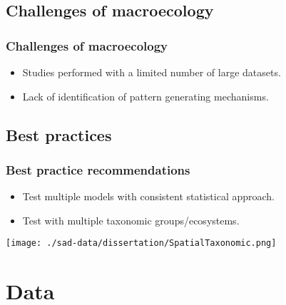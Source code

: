 \documentclass[14pt]{beamer}
\begin{document}
\subsection{Challenges of macroecology}
\begin{frame}[t]
\frametitle{Challenges of macroecology}
\begin{itemize}
\item Studies performed with a limited number of large datasets.
\item Lack of identification of pattern generating mechanisms.
\end{itemize}
\end{frame}



\subsection{Best practices}
\begin{frame}[t]
\frametitle{Best practice recommendations}
\begin{itemize}
\item Test multiple models with consistent statistical approach.
\item Test with multiple taxonomic groups/ecosystems.  
\end{itemize}
\vspace{-7pt}
\begin{center}
\texttt{[image: ./sad-data/dissertation/SpatialTaxonomic.png]}
\end{center}
\end{frame}


\section{Data}
\end{document}
